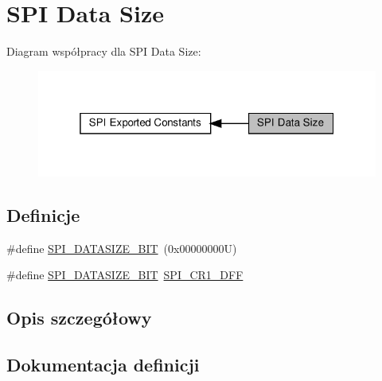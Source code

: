 \hypertarget{group___s_p_i___data___size}{}\section{S\+PI Data Size}
\label{group___s_p_i___data___size}
Diagram współpracy dla S\+PI Data Size\+:\nopagebreak
\begin{figure}[H]
\begin{center}
\leavevmode
\includegraphics[width=319pt]{group___s_p_i___data___size}
\end{center}
\end{figure}
\subsection*{Definicje}
\begin{DoxyCompactItemize}
\item 
\#define \hyperlink{group___s_p_i___data___size_ga773e9fc5d44c9661c829361fbd073152}{S\+P\+I\+\_\+\+D\+A\+T\+A\+S\+I\+Z\+E\+\_\+B\+IT}~(0x00000000\+U)
\item 
\#define \hyperlink{group___s_p_i___data___size_ga902147b9ead27cd9333240c72ce74f59}{S\+P\+I\+\_\+\+D\+A\+T\+A\+S\+I\+Z\+E\+\_\+B\+IT}~\hyperlink{group___peripheral___registers___bits___definition_ga3ffabea0de695a19198d906bf6a1d9fd}{S\+P\+I\+\_\+\+C\+R1\+\_\+\+D\+FF}
\end{DoxyCompactItemize}


\subsection{Opis szczegółowy}


\subsection{Dokumentacja definicji}
\mbox{\label{group___s_p_i___data___size_ga902147b9ead27cd9333240c72ce74f59}} 
